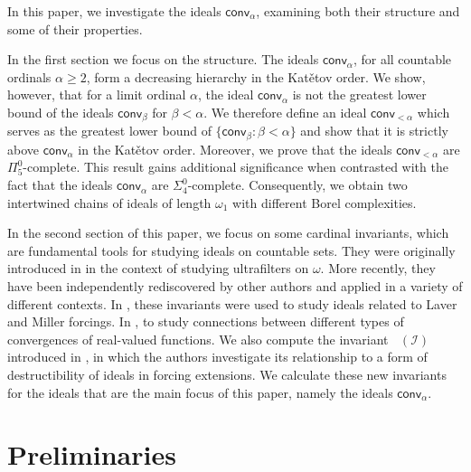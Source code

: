 \documentclass{amsart}
\theoremstyle{plain}
\theoremstyle{definition}
\theoremstyle{remark}
\newcommand{\cI}{\mathcal{I}}
\newcommand{\I}{\cI}
\DeclareMathOperator{\cov}{cov}
\DeclareMathOperator{\covp}{\cov^*_+}
\newcommand{\conv}{\mathsf{conv}}
\begin{document}
In this paper, we investigate the ideals $\conv_\alpha$, examining both their structure and some of their properties.



In the first section we focus on the structure.
The ideals $\conv_\alpha$, for all countable ordinals $\alpha \geq 2$, form a decreasing hierarchy in the Kat\v{e}tov order. We show, however, that for a limit ordinal $\alpha$, the ideal $\conv_\alpha$ is not the greatest lower bound of the ideals $\conv_\beta$ for $\beta<\alpha$.
We therefore define an ideal $\conv_{<\alpha}$ which serves as the greatest lower bound of  $\{\conv_\beta : \beta<\alpha\}$ and show that it is strictly above $\conv_\alpha$ in the Kat\v{e}tov order. Moreover, we prove that the ideals $\conv_{<\alpha}$ are $\Pi^0_5$-complete. This result gains additional significance when contrasted with the fact that the ideals $\conv_\alpha$ are $\Sigma^0_4$-complete. Consequently, we obtain two intertwined chains of ideals of length $\omega_1$ with different Borel complexities.

In the second section of this paper, we focus on some cardinal invariants, which are fundamental tools for studying ideals on countable sets. They were originally introduced in \cite{MR1686797} in the context of studying ultrafilters on $\omega$. More recently, they have been independently rediscovered by other authors and applied in a variety of different contexts. In \cite{Alek-Miller-Nulls,Alek-Arturo-Miller-Trees}, these invariants were used to study ideals related to Laver and Miller forcings. In \cite{MR4905423}, to study connections between different types of convergences of real-valued functions. We also compute the invariant $\covp(\I)$ introduced in \cite{MR4472520}, in which the authors investigate its relationship to a form of destructibility of ideals in forcing extensions.
 We calculate these new invariants for the ideals that are the main focus of this paper, namely the ideals $\conv_\alpha$.



\section{Preliminaries}
\label{sec:prelim}
\end{document}
